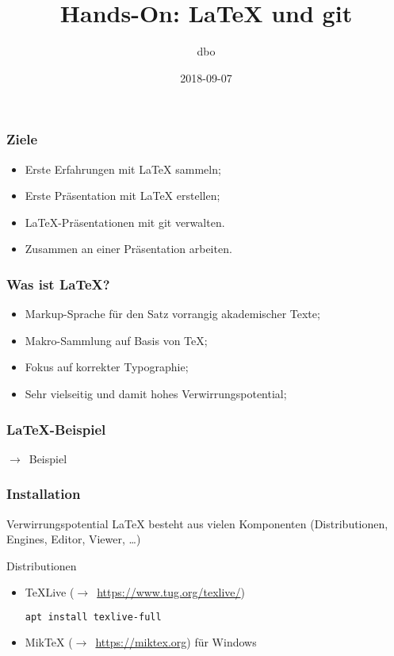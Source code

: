 \documentclass{cms-kurs}
\title{Hands-On: \LaTeX{} und git}
\author{dbo}
\date{2018-09-07}
\begin{document}
\begin{frame}
  \frametitle{Ziele}

  \onslide<+->

  \begin{itemize}
  \item Erste Erfahrungen mit \LaTeX{} sammeln;
  \item Erste Präsentation mit \LaTeX{} erstellen;
  \item \LaTeX{}-Präsentationen mit git verwalten.
  \item Zusammen an einer Präsentation arbeiten.
  \end{itemize}

\end{frame}

\begin{frame}
  \frametitle{Was ist \LaTeX?}

  \onslide<+->

  \begin{itemize}
  \item Markup-Sprache für den Satz vorrangig akademischer Texte;
  \item Makro-Sammlung auf Basis von \TeX{};
  \item Fokus auf korrekter Typographie;
  \item Sehr vielseitig und damit hohes Verwirrungspotential;
  \end{itemize}

\end{frame}

\begin{frame}
  \frametitle{\LaTeX{}-Beispiel}

  \onslide<+->

  $\to$~Beispiel

\end{frame}

\begin{frame}[fragile]
  \frametitle{Installation}

  \onslide<+->

  \begin{block}{Verwirrungspotential}
    \LaTeX{} besteht aus vielen Komponenten (Distributionen, Engines, Editor,
    Viewer, \ldots)
  \end{block}

  \onslide<+->

  \bigskip{}

  \begin{block}{Distributionen}
    \begin{itemize}
    \item \TeX{}Live ($\to$~\url{https://www.tug.org/texlive/})
      \begin{lstlisting}[language=Bash]
        apt install texlive-full
      \end{lstlisting}
    \item Mik\TeX{} ($\to$~\url{https://miktex.org}) für Windows
    \end{itemize}
  \end{block}

\end{frame}
\end{document}
